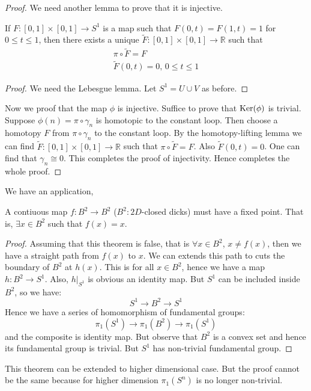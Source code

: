 \begin{proof}
    We need another lemma to prove that it is injective.
    \begin{lemma}
        If $F:[0,1]\times[0,1]\to S^1$ is a map such that
        $F(0,t)=F(1,t)=1$ for $0\leq t\leq 1$, then there exists a
        unique $\tilde F: [0,1]\times[0,1]\to \mathbb{R}$ such that
        \begin{align}
            \pi\circ \tilde F = F \\
            \tilde F(0,t) =0,\, 0\leq t\leq 1
        \end{align}
    \end{lemma}
    \begin{proof}
        We need the Lebesgue lemma. Let $S^1=U\cup V$ as before.
    \end{proof}
    Now we proof that the map $\phi$ is injective. Suffice to prove
    that $\operatorname{Ker}(\phi)$ is trivial. Suppose $\phi(n)=\pi\circ \gamma_n$
    is homotopic to the constant loop. Then choose a homotopy $F$
    from $\pi\circ\gamma_n$ to the constant loop. By the
    homotopy-lifting lemma we can find $\tilde F: [0,1]\times[0,1]\to
    \mathbb{R}$ such that $\pi\circ \tilde F = F$. Also $\tilde
    F(0,t)=0$.
    One can find that $\gamma_n\cong 0$. This completes the proof of
    injectivity. Hence completes the whole proof.
\end{proof}

We have an application,
\begin{thm} %
    A contiuous map $f:B^2\to B^2$ ($B^2:2D$-closed dicks) must have a
fixed point. That is, $\exists x\in B^2$ such that $f(x)=x$.
\end{thm}
\begin{proof}
    Assuming that this theorem is false, that is $\forall x\in B^2$,
    $x\neq f(x)$, then we have a straight path from $f(x)$ to $x$. We can
    extends this path to cuts the boundary of $B^2$ at $h(x)$. This is
    for all $x\in B^2$, hence we have a map $h: B^2 \to S^1$. Also,
    $h|_{S^1}$ is obvious an identity map. But $S^1$ can be included
    inside $B^2$, so we have:
    \begin{equation}
        S^1 \to B^2 \to S^1 %
    \end{equation}
    Hence we have a series of homomorphism of fundamental groups:
    \begin{equation}
        \pi_1 (S^1) \to \pi_1 (B^2) \to \pi_1(S^1)
    \end{equation}
    and the composite is identity map. But observe that $B^2$ is a
    convex set and hence its fundamental group is trivial. But $S^1$
    has non-trivial fundamental group.
\end{proof}
\begin{remark}
    This theorem can be extended to higher dimensional case. But the
    proof cannot be the same because for higher dimension $\pi_1(S^n)$
    is no longer non-trivial.
\end{remark}

